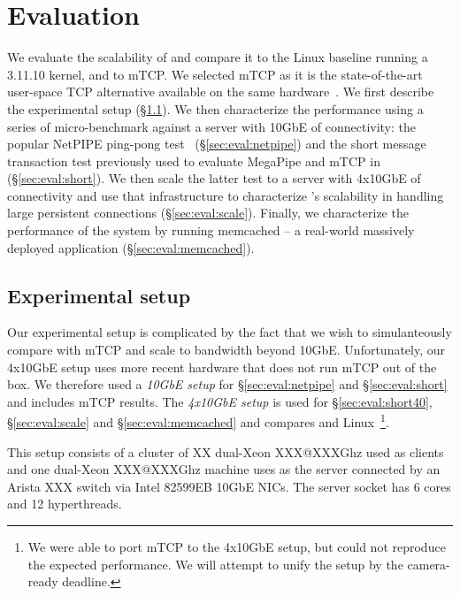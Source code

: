 
\section{Evaluation}
\label{sec:eval}

We evaluate the scalability of \ix and compare it to the Linux
baseline running a 3.11.10 kernel, and to mTCP. We selected mTCP as it
is the state-of-the-art user-space TCP alternative available on the
same hardware~\cite{jeong2014mtcp}.  We first describe the
experimental setup (\S\ref{sec:eval:setup}).  We then characterize the
performance using a series of micro-benchmark against a server with
10GbE of connectivity: the popular NetPIPE ping-pong
test~\cite{snell1996netpipe} (\S\ref{sec:eval:netpipe}) and the short
message transaction test previously used to evaluate MegaPipe and mTCP
in~\cite{han2012megapipe,jeong2014mtcp} (\S\ref{sec:eval:short}).  We
then scale the latter test to a server with 4x10GbE of connectivity
and use that infrastructure to characterize \ix's scalability in
handling large persistent connections (\S\ref{sec:eval:scale}).
Finally, we characterize the performance of the \ix system by running
memcached -- a real-world massively deployed application
(\S\ref{sec:eval:memcached}).


\subsection{Experimental setup}
\label{sec:eval:setup}

Our experimental setup is complicated by the fact that we wish to
simulanteously compare with mTCP and scale to bandwidth beyond 10GbE.
Unfortunately, our 4x10GbE setup uses more recent hardware that does
not run mTCP out of the box.  We therefore used a \emph{10GbE setup}
for \S\ref{sec:eval:netpipe} and \S\ref{sec:eval:short} and includes
mTCP results. The \emph{4x10GbE setup} is used for
\S\ref{sec:eval:short40}, \S\ref{sec:eval:scale} and
\S\ref{sec:eval:memcached} and compares \ix and Linux~\footnote{We
  were able to port mTCP to the 4x10GbE setup, but could not reproduce
  the expected performance.  We will attempt to unify the setup by the
  camera-ready deadline.}.

 
  This setup consists of a
cluster of XX dual-Xeon XXX@XXXGhz used as clients and one dual-Xeon
XXX@XXXGhz machine uses as the server connected by an Arista XXX
switch via Intel 82599EB 10GbE NICs.  The server socket has 6 cores and
12 hyperthreads.

